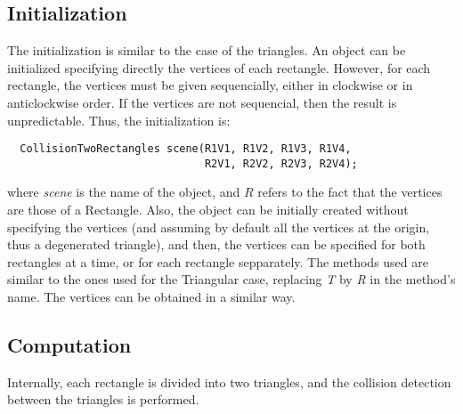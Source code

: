 \documentclass[11pt,a4paper]{article}
\begin{document}
\subsection*{Initialization}
 The initialization is similar to the case of the triangles. An object can be initialized specifying directly the vertices of each rectangle. However, for each rectangle, the vertices must be given sequencially, either in clockwise or in anticlockwise order. If the vertices are not sequencial, then the result is unpredictable. Thus, the initialization is:
  \begin{lstlisting}
  CollisionTwoRectangles scene(R1V1, R1V2, R1V3, R1V4,
                               R2V1, R2V2, R2V3, R2V4);
  \end{lstlisting}
where \textit{scene} is the name of the object, and $R$ refers to the fact that the vertices are those of a Rectangle. Also, the object can be initially created without specifying the vertices (and assuming by default all the vertices at the origin, thus a degenerated triangle), and then, the vertices can be specified for both rectangles at a time, or for each rectangle sepparately. The methods used are similar to the ones used for the Triangular case, replacing \textit{T} by \textit{R} in the method's name. The vertices can be obtained in a similar way. 

\subsection*{Computation}

Internally, each rectangle is divided into two triangles, and the collision detection between the triangles is performed. 






\end{document}
